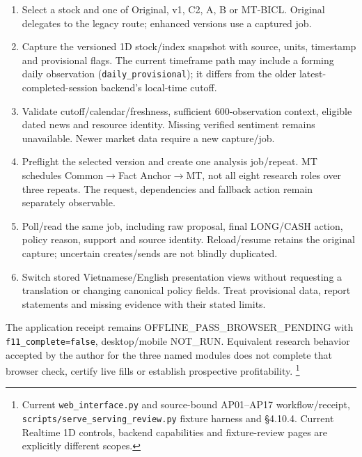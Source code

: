 \begin{enumerate}
\def\labelenumi{\arabic{enumi}.}
\tightlist
\item
  Select a stock and one of Original, v1, C2, A, B or MT-BICL. Original
  delegates to the legacy route; enhanced versions use a captured job.
\item
  Capture the versioned 1D stock/index snapshot with source, units,
  timestamp and provisional flags. The current timeframe path may
  include a forming daily observation (\texttt{daily\_\allowbreak{}provisional}); it differs
  from the older latest-completed-session backend's local-time cutoff.
\item
  Validate cutoff/calendar/freshness, sufficient 600-observation context,
  eligible dated news and resource identity. Missing verified sentiment
  remains unavailable. Newer market data require a new capture/job.
\item
  Preflight the selected version and create one analysis job/repeat.
  MT schedules Common\ensuremath{\rightarrow}Fact Anchor\ensuremath{\rightarrow}MT, not all eight research roles over
  three repeats. The request, dependencies and fallback action remain
  separately observable.
\item
  Poll/read the same job, including raw proposal, final LONG/CASH action,
  policy reason, support and source identity. Reload/resume retains the
  original capture; uncertain creates/sends are not blindly duplicated.
\item
  Switch stored Vietnamese/English presentation views without requesting
  a translation or changing canonical policy fields. Treat provisional
  data, report statements and missing evidence with their stated limits.
\end{enumerate}

The application receipt remains OFFLINE\_\allowbreak{}PASS\_\allowbreak{}BROWSER\_\allowbreak{}PENDING with
\texttt{f11\_\allowbreak{}complete=false}, desktop/mobile NOT\_\allowbreak{}RUN. Equivalent research behavior
accepted by the author for the three named modules does not complete that
browser check, certify live fills or establish prospective profitability.
\footnote{Current \texttt{web\_\allowbreak{}interface.\allowbreak{}py} and source-bound AP01--AP17 workflow/receipt, \texttt{scripts/\allowbreak{}serve\_\allowbreak{}serving\_\allowbreak{}review.\allowbreak{}py} fixture harness and §4.10.4. Current Realtime 1D controls, backend capabilities and fixture-review pages are explicitly different scopes.}
